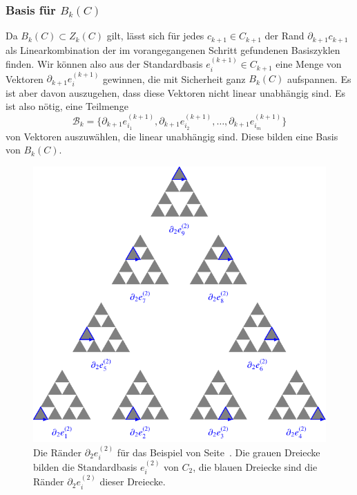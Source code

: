 \subsubsection{Basis für $B_k(C)$}
Da $B_k(C)\subset Z_k(C)$ gilt, lässt sich für jedes $c_{k+1}\in C_{k+1}$
der Rand $\partial_{k+1}c_{k+1}$ als Linearkombination der im 
vorangegangenen Schritt gefundenen Basiszyklen finden.
Wir können also aus der Standardbasis $e^{(k+1)}_i\in C_{k+1}$ eine Menge
von Vektoren $\partial_{k+1}e^{(k+1)}_i$ gewinnen, die mit Sicherheit
ganz $B_k(C)$ aufspannen.
Es ist aber davon auszugehen, dass diese Vektoren nicht linear unabhängig
sind.
Es ist also nötig, eine Teilmenge
\[
\mathcal{B}_k
=
\{
\partial_{k+1}e^{(k+1)}_{i_1},
\partial_{k+1}e^{(k+1)}_{i_2},
\dots,
\partial_{k+1}e^{(k+1)}_{i_m}
\}
\]
von Vektoren auszuwählen, die linear
unabhängig sind.
Diese bilden eine Basis von $B_k(C)$.

\begin{figure}
\centering
\includegraphics{chapters/95-homologie/images/homoboundaries.pdf}
\caption{Die Ränder $\partial_2e_i^{(2)}$ für das Beispiel von
Seite~\pageref{buch:homologie:beispiel:gausshomo}.
Die grauen Dreiecke bilden die Standardbasis $e_i^{(2)}$ von $C_2$,
die blauen Dreiecke sind die Ränder $\partial_2e_i^{(2)}$ dieser
Dreiecke.
\label{buch:homologie:fig:homoboundaries}}
\end{figure}

